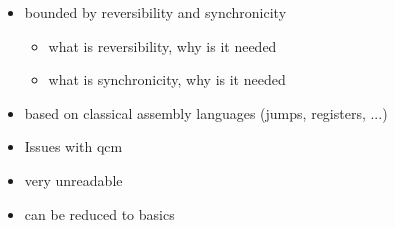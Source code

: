 \begin{itemize}
    \item bounded by reversibility and synchronicity
    \begin{itemize}
        \item what is reversibility, why is it needed
        \item what is synchronicity, why is it needed
    \end{itemize}
    \item based on classical assembly languages (jumps, registers, ...)
\end{itemize}

\begin{itemize}
    \item Issues with qcm
    \item very unreadable
    \item can be reduced to basics
\end{itemize}